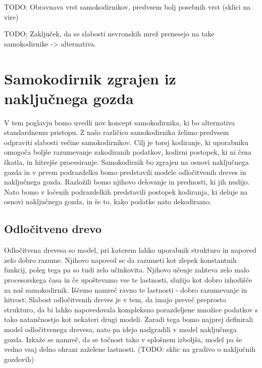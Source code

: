 \documentclass[12pt,a4paper,twoside]{article}
\theoremstyle{definition} %
\theoremstyle{plain} %
\numberwithin{equation}{section}  %
\begin{document}

TODO: Obravnava vrst samokodirnikov, predvsem bolj posebnih vrst (sklici na vire)

TODO: Zaključek, da se slabosti nevronskih mrež prenesejo na take samokodirnike -> alternativa.




\section{Samokodirnik zgrajen iz naključnega gozda}

V tem poglavju bomo uvedli nov koncept samokodirnika, ki bo alternativa standardnemu pristopu. 
Z našo različico samokodirnika želimo predvsem odpraviti slabosti večine samokodirnikov. 
Cilj je torej kodiranje, ki uporabniku omogoča boljše razumevanje zakodiranih podatkov, kodirni postopek, ki ni črna škatla, in hitrejše procesiranje. 
Samokodirnik bo zgrajen na osnovi naključnega gozda in v prvem podrazdelku bomo predstavili modele odločitvenih dreves in naključnega gozda. 
Razložili bomo njihovo delovanje in prednosti, ki jih nudijo. 
Nato bomo v ločenih podrazdelkih predstavili postopek kodiranja, ki deluje na osnovi naključnega gozda, in še to, kako podatke nato dekodiramo.



\subsection{Odločitveno drevo}

Odločitvena drevesa so model, pri katerem lahko uporabnik strukturo in napoved zelo dobro razume. 
Njihovo napoved se da razumeti kot zlepek konstantnih funkcij, poleg tega pa so tudi zelo učinkovita. 
Njihovo učenje zahteva zelo malo procesorskega časa in če upoštevamo vse te lastnosti, služijo kot dobro izhodišče za naš samokodirnik. 
Iščemo namreč ravno te lastnosti - dobro razumevanje in hitrost. Slabost odločitvenih dreves je v tem, da imajo preveč preprosto strukturo, 
da bi lahko napovedovala kompleksno porazdeljene množice podatkov s tako natančnostjo kot nekateri drugi modeli. 
Zaradi tega bomo najprej definirali model odločitvenega drevesa, nato pa idejo nadgradili v model naključnega gozda. 
Izkaže se namreč, da se točnost tako v splošnem izboljša, model pa še vedno vsaj delno ohrani zaželene lastnosti. (TODO: sklic na gradivo o naključnih gozdovih)
\end{document}
